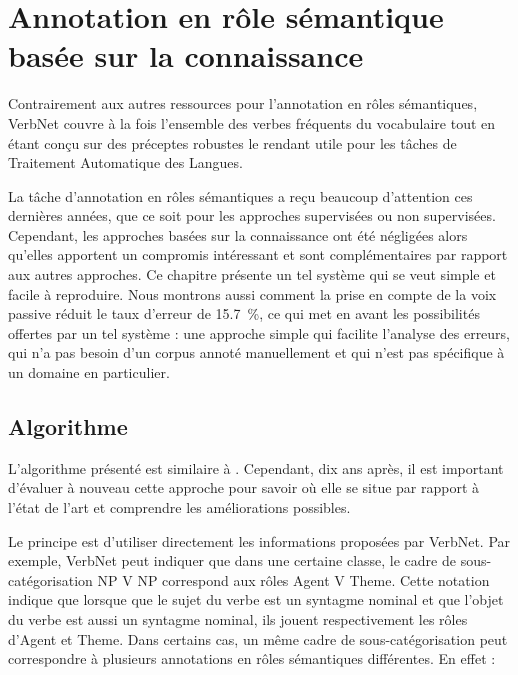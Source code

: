 \chapter{Annotation en rôle sémantique basée sur la connaissance}
\label{ch:srl}



Contrairement aux autres ressources pour l'annotation en rôles sémantiques,
VerbNet couvre à la fois l'ensemble des verbes fréquents du vocabulaire tout en
étant conçu sur des préceptes robustes le rendant utile pour les tâches de
Traitement Automatique des Langues.

La tâche d'annotation en rôles sémantiques a reçu beaucoup d'attention ces
dernières années, que ce soit pour les approches supervisées ou non
supervisées. Cependant, les approches basées sur la connaissance ont été
négligées alors qu'elles apportent un compromis intéressant et sont
complémentaires par rapport aux autres approches. Ce chapitre présente un tel
système qui se veut simple et facile à reproduire. Nous montrons aussi comment
la prise en compte de la voix passive réduit le taux d'erreur de 15.7~\%, ce
qui met en avant les possibilités offertes par un tel système : une approche
simple qui facilite l'analyse des erreurs, qui n'a pas besoin d'un corpus
annoté manuellement et qui n'est pas spécifique à un domaine en particulier.

\section{Algorithme}

L'algorithme présenté est similaire à
\cite{swier2004unsupervised,swier2005exploiting}. Cependant, dix ans après, il
est important d'évaluer à nouveau cette approche pour savoir où elle se situe
par rapport à l'état de l'art et comprendre les améliorations possibles.

Le principe est d'utiliser directement les informations proposées par VerbNet.
Par exemple, VerbNet peut indiquer que dans une certaine classe, le cadre de
sous-catégorisation NP V NP correspond aux rôles Agent V Theme. Cette notation
indique que lorsque que le sujet du verbe est un syntagme nominal et que
l'objet du verbe est aussi un syntagme nominal, ils jouent respectivement les
rôles d'Agent et Theme. Dans certains cas, un même cadre de sous-catégorisation
peut correspondre à plusieurs annotations en rôles sémantiques différentes. En effet :

